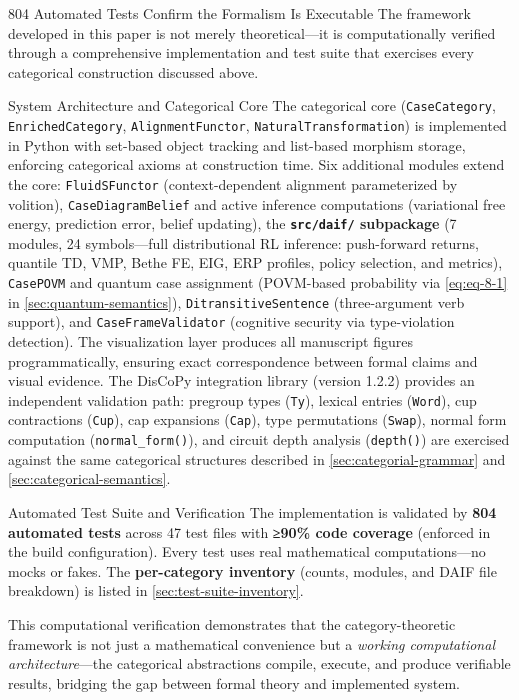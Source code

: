 \documentclass[
  ignorenonframetext,
]{beamer}
\begin{document}
\begin{frame}[fragile]{804 Automated Tests Confirm the Formalism Is
Executable}
\protect{}\label{automated-tests-confirm-the-formalism-is-executable}
The framework developed in this paper is not merely theoretical---it is
computationally verified through a comprehensive implementation and test
suite that exercises every categorical construction discussed above.

\begin{block}{System Architecture and Categorical Core}
\protect{}\label{system-architecture-and-categorical-core}
The categorical core (\texttt{CaseCategory}, \texttt{EnrichedCategory},
\texttt{AlignmentFunctor}, \texttt{NaturalTransformation}) is
implemented in Python with set-based object tracking and list-based
morphism storage, enforcing categorical axioms at construction time. Six
additional modules extend the core: \texttt{FluidSFunctor}
(context-dependent alignment parameterized by volition),
\texttt{CaseDiagramBelief} and active inference computations
(variational free energy, prediction error, belief updating), the
\textbf{\texttt{src/daif/} subpackage} (7 modules, 24 symbols---full
distributional RL inference: push-forward returns, quantile TD, VMP,
Bethe FE, EIG, ERP profiles, policy selection, and metrics),
\texttt{CasePOVM} and quantum case assignment (POVM-based probability
via \autoref{eq:eq-8-1} in \autoref{sec:quantum-semantics}),
\texttt{DitransitiveSentence} (three-argument verb support), and
\texttt{CaseFrameValidator} (cognitive security via type-violation
detection). The visualization layer produces all manuscript figures
programmatically, ensuring exact correspondence between formal claims
and visual evidence. The DisCoPy integration library (version 1.2.2)
provides an independent validation path: pregroup types (\texttt{Ty}),
lexical entries (\texttt{Word}), cup contractions (\texttt{Cup}), cap
expansions (\texttt{Cap}), type permutations (\texttt{Swap}), normal
form computation (\texttt{normal\_form()}), and circuit depth analysis
(\texttt{depth()}) are exercised against the same categorical structures
described in \autoref{sec:categorial-grammar} and
\autoref{sec:categorical-semantics}.
\end{block}

\begin{block}{Automated Test Suite and Verification}
\protect{}\label{automated-test-suite-and-verification}
The implementation is validated by \textbf{804 automated tests} across
47 test files with \textbf{≥90\% code coverage} (enforced in the build
configuration). Every test uses real mathematical computations---no
mocks or fakes. The \textbf{per-category inventory} (counts, modules,
and DAIF file breakdown) is listed in
\autoref{sec:test-suite-inventory}.

This computational verification demonstrates that the category-theoretic
framework is not just a mathematical convenience but a \emph{working
computational architecture}---the categorical abstractions compile,
execute, and produce verifiable results, bridging the gap between formal
theory and implemented system.
\end{block}
\end{frame}
\end{document}
